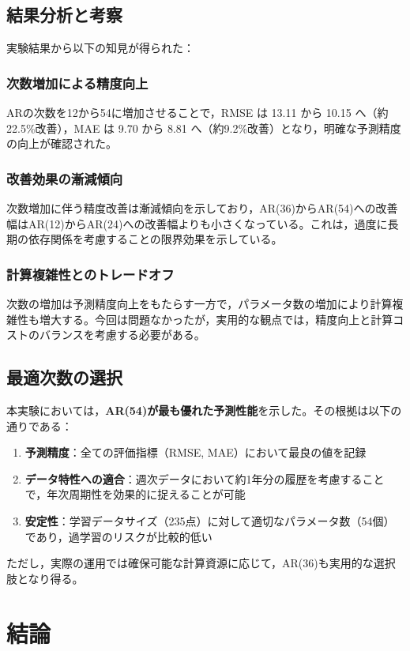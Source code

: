 \documentclass[12pt]{article}
\begin{document}
\subsection{結果分析と考察}
実験結果から以下の知見が得られた：

\subsubsection{次数増加による精度向上}
ARの次数を12から54に増加させることで，RMSE は 13.11 から 10.15 へ（約22.5\%改善），MAE は 9.70 から 8.81 へ（約9.2\%改善）となり，明確な予測精度の向上が確認された。

\subsubsection{改善効果の漸減傾向}
次数増加に伴う精度改善は漸減傾向を示しており，AR(36)からAR(54)への改善幅はAR(12)からAR(24)への改善幅よりも小さくなっている。これは，過度に長期の依存関係を考慮することの限界効果を示している。

\subsubsection{計算複雑性とのトレードオフ}
次数の増加は予測精度向上をもたらす一方で，パラメータ数の増加により計算複雑性も増大する。今回は問題なかったが，実用的な観点では，精度向上と計算コストのバランスを考慮する必要がある。

\subsection{最適次数の選択}
本実験においては，\textbf{AR(54)が最も優れた予測性能}を示した。その根拠は以下の通りである：

\begin{enumerate}
\item \textbf{予測精度}：全ての評価指標（RMSE, MAE）において最良の値を記録
\item \textbf{データ特性への適合}：週次データにおいて約1年分の履歴を考慮することで，年次周期性を効果的に捉えることが可能
\item \textbf{安定性}：学習データサイズ（235点）に対して適切なパラメータ数（54個）であり，過学習のリスクが比較的低い
\end{enumerate}

ただし，実際の運用では確保可能な計算資源に応じて，AR(36)も実用的な選択肢となり得る。

\section{結論}
\end{document}

